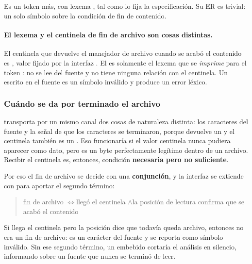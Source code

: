 \documentclass[11pt,a4paper]{article}
\begin{document}
\subsection{}

Es un token más, con lexema \lex{\$}, tal como lo fija la especificación. Su ER es trivial: un solo
símbolo sobre la condición de fin de contenido.

\paragraph{El lexema \lex{\$} y el centinela de fin de archivo son cosas distintas.} El centinela que
devuelve el manejador de archivo cuando se acabó el contenido es , valor fijado por la
interfaz . El \lex{\$} es solamente el lexema que se \emph{imprime} para el token
: no se lee del fuente y no tiene ninguna relación con el centinela. Un \lex{\$} escrito en
el fuente es un símbolo inválido y produce un error léxico.

\subsubsection{Cuándo se da por terminado el archivo}

 transporta por un mismo canal dos cosas de naturaleza distinta: los caracteres
del fuente y la señal de que los caracteres se terminaron, porque  devuelve un
 y el centinela también es un . Eso funcionaría si el valor centinela nunca
pudiera aparecer como dato, pero  es un byte perfectamente legítimo dentro de un archivo.
Recibir el centinela es, entonces, condición \textbf{necesaria pero no suficiente}.

Por eso el fin de archivo se decide con una \textbf{conjunción}, y la interfaz se extiende con
 para aportar el segundo término:

\begin{quote}
fin de archivo \quad$\Longleftrightarrow$\quad llegó el centinela \quad$\wedge$\quad la posición de
lectura confirma que se acabó el contenido
\end{quote}

Si llega el centinela pero la posición dice que todavía queda archivo, entonces no era un fin de
archivo: es un carácter del fuente y se reporta como símbolo inválido. Sin ese segundo término, un
 embebido cortaría el análisis en silencio, informando \lex{[SinErrores]} sobre un fuente
que nunca se terminó de leer.
\end{document}
